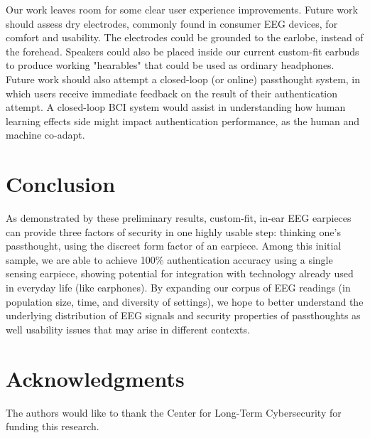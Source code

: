 \documentclass{sigchi-ext}
\begin{document}

Our work leaves room for some clear user experience improvements. Future work should assess dry electrodes, commonly found in consumer EEG devices, for comfort and usability. The electrodes could be grounded to the earlobe, instead of the forehead. Speakers could also be placed inside our current custom-fit earbuds to produce working "hearables" that could be used as ordinary headphones. Future work should also attempt a closed-loop (or online) passthought system, in which users receive immediate feedback on the result of their authentication attempt. A closed-loop BCI system would assist in understanding how human learning effects side might impact authentication performance, as the human and machine co-adapt.

\section{Conclusion}

As demonstrated by these preliminary results, custom-fit, in-ear EEG earpieces can provide three factors of security in one highly usable step: thinking one's passthought, using the discreet form factor of an earpiece. Among this initial sample, we are able to achieve 100\% authentication accuracy using a single sensing earpiece, showing potential for integration with technology already used in everyday life (like earphones). By expanding our corpus of EEG readings (in population size, time, and diversity of settings), we hope to better understand the underlying distribution of EEG signals and security properties of passthoughts as well usability issues that may arise in different contexts.

\section{Acknowledgments}
The authors would like to thank the Center for Long-Term Cybersecurity for funding this research.
\end{document}
